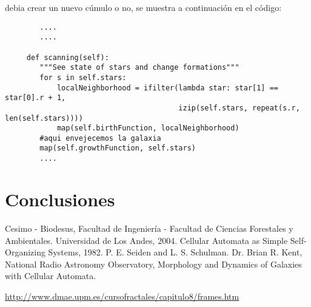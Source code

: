 \documentclass[12tp]{article}
\begin{document}
debia crear un nuevo cúmulo o no, se muestra a continuación en el código:
\begin{small}
    \begin{verbatim}
        ....
        ....
        
     def scanning(self):
        """See state of stars and change formations"""
        for s in self.stars:
            localNeighborhood = ifilter(lambda star: star[1] == star[0].r + 1,
                                        izip(self.stars, repeat(s.r, len(self.stars))))
            map(self.birthFunction, localNeighborhood)
        #aqui envejecemos la galaxia
        map(self.growthFunction, self.stars)
        ....
    \end{verbatim}
\end{small}
\section{Conclusiones}

\begin{small}
\begin{thebibliography}{1}
 Cesimo - Biodesus, Facultad de Ingeniería - Facultad de Ciencias Forestales y Ambientales. Universidad de Los Andes, 2004.
 Cellular Automata as Simple Self-Organizing Systems, 1982.
 P. E. Seiden and L. S. Schulman.
Dr. Brian R. Kent, National	Radio Astronomy Observatory, Morphology and Dynamics of Galaxies with Cellular Automata.
	
  

\url{http://www.dmae.upm.es/cursofractales/capitulo8/frames.htm}
\end{thebibliography}
\end{small}
\end{document}
